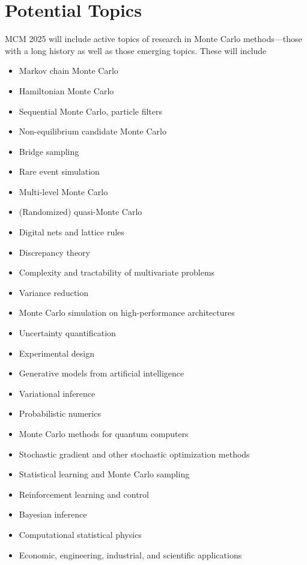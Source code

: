 \documentclass{article}
\newcommand{\ny}[1]{{\color{brown}Yiou: #1}}
\begin{document}
\section{Potential Topics}
MCM 2025 will include active topics of research in Monte Carlo methods---those with a long history as well as those emerging topics.  These will include
\begin{itemize}
\item Markov chain Monte Carlo
\item Hamiltonian Monte Carlo
\item Sequential Monte Carlo, particle filters
\item Non-equilibrium candidate Monte Carlo
\item Bridge sampling
\item Rare event simulation
\item Multi-level Monte Carlo
\item (Randomized) quasi-Monte Carlo
\item Digital nets and lattice rules
\item Discrepancy theory
\item Complexity and tractability of multivariate problems
\item Variance reduction
\item Monte Carlo simulation on high-performance architectures
\item Uncertainty quantification
\item Experimental design
\item Generative models from artificial intelligence
\item Variational inference
\item Probabilistic numerics
\item Monte Carlo methods for quantum computers
\item Stochastic gradient and other stochastic optimization methods
\item Statistical learning and Monte Carlo sampling
\item Reinforcement learning and control
\item Bayesian inference
\item Computational statistical physics
\item Economic, engineering, industrial, and scientific applications
\end{itemize}

\end{document}
